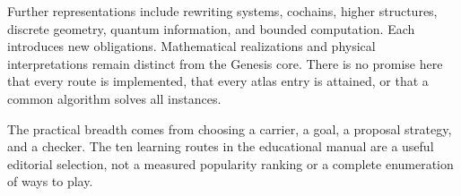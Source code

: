 \documentclass[
  11pt,
]{article}
\begin{document}
Further representations include rewriting systems, cochains, higher
structures, discrete geometry, quantum information, and bounded
computation. Each introduces new obligations. Mathematical realizations
and physical interpretations remain distinct from the Genesis core.
There is no promise here that every route is implemented, that every
atlas entry is attained, or that a common algorithm solves all
instances.

The practical breadth comes from choosing a carrier, a goal, a proposal
strategy, and a checker. The ten learning routes in the educational
manual are a useful editorial selection, not a measured popularity
ranking or a complete enumeration of ways to play.
\end{document}
